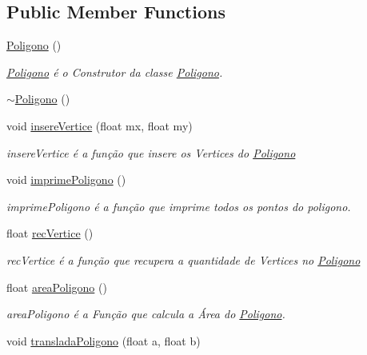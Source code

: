 \subsection*{Public Member Functions}
\begin{DoxyCompactItemize}
\item 
\mbox{\hyperlink{class_poligono_a9311a9a1496878c09c8508b3636e2870}{Poligono}} ()
\begin{DoxyCompactList}\small\item\em \mbox{\hyperlink{class_poligono}{Poligono}} é o Construtor da classe \mbox{\hyperlink{class_poligono}{Poligono}}. \end{DoxyCompactList}\item 
\mbox{\hyperlink{class_poligono_a4dd7136ee506cb4355cbdc724c55a4a0}{$\sim$\+Poligono}} ()
\item 
void \mbox{\hyperlink{class_poligono_a8cfc6f93c72f6ac5119a76cd339fc4c3}{insere\+Vertice}} (float mx, float my)
\begin{DoxyCompactList}\small\item\em insere\+Vertice é a função que insere os Vertices do \mbox{\hyperlink{class_poligono}{Poligono}} \end{DoxyCompactList}\item 
void \mbox{\hyperlink{class_poligono_a87d58f9d4827793eaa811491cce097b0}{imprime\+Poligono}} ()
\begin{DoxyCompactList}\small\item\em imprime\+Poligono é a função que imprime todos os pontos do poligono. \end{DoxyCompactList}\item 
float \mbox{\hyperlink{class_poligono_a29464a68eb3f3c00bb03f3f467d459c9}{rec\+Vertice}} ()
\begin{DoxyCompactList}\small\item\em rec\+Vertice é a função que recupera a quantidade de Vertices no \mbox{\hyperlink{class_poligono}{Poligono}} \end{DoxyCompactList}\item 
float \mbox{\hyperlink{class_poligono_ac1e37e274f61dff6c421f972ef1cf891}{area\+Poligono}} ()
\begin{DoxyCompactList}\small\item\em area\+Poligono é a Função que calcula a Área do \mbox{\hyperlink{class_poligono}{Poligono}}. \end{DoxyCompactList}\item 
void \mbox{\hyperlink{class_poligono_a4d757f52ba9366ab13537fb19b363e1e}{translada\+Poligono}} (float a, float b)

\end{DoxyCompactItemize}

